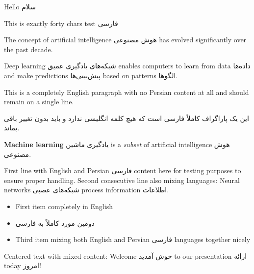\documentclass{article}
\begin{document}
Hello سلام

This is exactly forty chars test فارسی

The concept of artificial intelligence
هوش مصنوعی
has evolved significantly over the past decade.

Deep learning
شبکه‌های یادگیری عمیق
enables computers to learn from data
داده‌ها
and make predictions
پیش‌بینی‌ها
based on patterns
الگوها.

This is a completely English paragraph with no Persian content at all and should remain on a single line.

این یک پاراگراف کاملاً فارسی است که هیچ کلمه انگلیسی ندارد و باید بدون تغییر باقی بماند.

\textbf{Machine learning}
یادگیری ماشین
is a \emph{subset} of artificial intelligence
هوش مصنوعی.

First line with English and Persian
فارسی
content here for testing purposes to ensure proper handling.
Second consecutive line also mixing languages: Neural networks
شبکه‌های عصبی
process information
اطلاعات.

\begin{itemize}
\item First item completely in English
\item دومین مورد کاملاً به فارسی
\item Third item mixing both English and Persian
فارسی
languages together nicely
\end{itemize}

\begin{center}
Centered text with mixed content: Welcome
خوش آمدید
to our presentation
ارائه
today
امروز!
\end{center}
\end{document}
